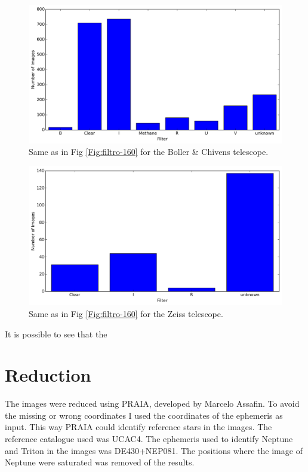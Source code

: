 \documentclass[12pt,a4paper]{report}
\newcommand{\BC}{Boller \& Chivens }
\begin{document}
\begin{figure}[H]
\includegraphics[width=16.0cm]{filtro_IAG.png} 
\caption{Same as in Fig \ref{Fig:filtro-160} for the \BC telescope.}
\label{Fig:filtro-IAG}
\end{figure}

\begin{figure}[H]
\includegraphics[width=16.0cm]{filtro_ZEI.png} 
\caption{Same as in Fig \ref{Fig:filtro-160} for the Zeiss telescope.}
\label{Fig:filtro-ZEI}
\end{figure}

It is possible to see that the 


\section*{Reduction}

The images were reduced using PRAIA, developed by Marcelo Assafin. To avoid the missing or wrong coordinates I used the coordinates of the ephemeris as input. This way PRAIA could identify reference stars in the images. The reference catalogue used was UCAC4. The ephemeris used to identify Neptune and Triton in the images was DE430+NEP081. The positions where the image of Neptune were saturated was removed of the results.
\end{document}
